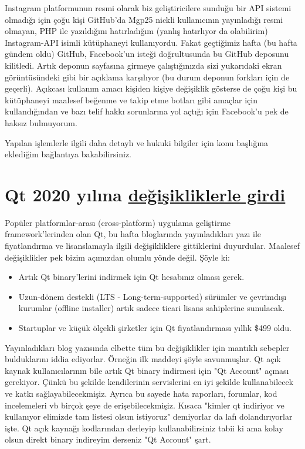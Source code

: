 \documentclass[11pt]{article}
\begin{document}
Instagram platformunun resmi olarak biz geliştiricilere sunduğu bir API
sistemi olmadığı için çoğu kişi GitHub'da Mgp25 nickli kullanıcının
yayınladığı resmi olmayan, PHP ile yazıldığını hatırladığım (yanlış hatırlıyor
da olabilirim) Instagram-API isimli kütüphaneyi kullanıyordu. Fakat geçtiğimiz
hafta (bu hafta gündem oldu) GitHub, Facebook'un isteği doğrultusunda bu
GitHub deposunu kilitledi. Artık deponun sayfasına girmeye çalıştığınızda sizi
yukarıdaki ekran görüntüsündeki gibi bir açıklama karşılıyor (bu durum deponun
forkları için de geçerli). Açıkcası kullanım amacı kişiden kişiye değişiklik
gösterse de çoğu kişi bu kütüphaneyi maalesef beğenme ve takip etme botları
gibi amaçlar için kullandığından ve bazı telif hakkı sorunlarına yol açtığı
için Facebook'u pek de haksız bulmuyorum.

Yapılan işlemlerle ilgili daha detaylı ve hukuki bilgiler için konu başlığına
eklediğim bağlantıya bakabilirsiniz.
\section{Qt 2020 yılına \href{https://www.qt.io/blog/qt-offering-changes-2020}{değişikliklerle girdi}}
\label{sec:org01204b4}
Popüler platformlar-arası (cross-platform) uygulama geliştirme
framework'lerinden olan Qt, bu hafta bloglarında yayınladıkları yazı ile
fiyatlandırma ve lisanslamayla ilgili değişikliklere gittiklerini duyurdular.
Maalesef değişiklikler pek bizim açımızdan olumlu yönde değil. Şöyle ki:

\begin{itemize}
\item Artık Qt binary'lerini indirmek için Qt hesabınız olması gerek.
\item Uzun-dönem destekli (LTS - Long-term-supported) sürümler ve çevrimdışı
kurumlar (offline installer) artık sadece ticari lisans sahiplerine
sunulacak.
\item Startuplar ve küçük ölçekli şirketler için Qt fiyatlandırması yıllık \$499
oldu.
\end{itemize}

Yayınladıkları blog yazısında elbette tüm bu değişiklikler için mantıklı
sebepler bulduklarını iddia ediyorlar. Örneğin ilk maddeyi şöyle savunmuşlar.
Qt açık kaynak kullanıcılarının bile artık Qt binary indirmesi için "Qt
Account" açması gerekiyor. Çünkü bu şekilde kendilerinin servislerini en iyi
şekilde kullanabilecek ve katkı sağlayabilecekmişiz. Ayrıca bu sayede hata
raporları, forumlar, kod incelemeleri vb birçok şeye de erişebilecekmişiz.
Kısaca "kimler qt indiriyor ve kullanıyor elimizde tam listesi olsun
istiyoruz" demiyorlar da lafı dolandırıyorlar işte. Qt açık kaynağı
kodlarından derleyip kullanabilirsiniz tabii ki ama kolay olsun direkt binary
indireyim derseniz "Qt Account" şart.
\end{document}
